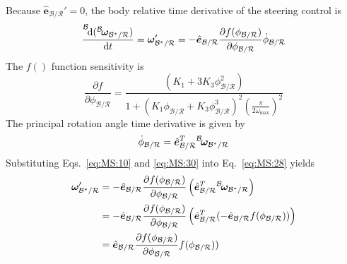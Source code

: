 \documentclass[]{BasiliskReportMemo}
\begin{document}
Because $\hat{\bm e}_{\mathcal{B}/\mathcal{R}}'= 0$, the body relative time derivative of the steering control is
\begin{equation}
	\label{eq:MS:28}
	\frac{\leftexp{B}{\D (\leftexp{B}{\bm\omega}_{{\mathcal{B}}^{\ast}/\mathcal{R}} ) }}{\D t} =
	{\bm\omega}_{{\mathcal{B}}^{\ast}/\mathcal{R}} '
	= - \hat{\bm e}_{\mathcal{B}/\mathcal{R}} \frac{\partial f(\phi_{\mathcal{B}/\mathcal{R}})}{\partial \phi_{\mathcal{B}/\mathcal{R}}} \dot\phi_{\mathcal{B}/\mathcal{R}}
\end{equation}
The $f()$ function sensitivity is
\begin{equation}
	\frac{
		\partial f
	}{
		\partial \phi_{\mathcal{B}/\mathcal{R}}
	} = 
	\frac{
	(K_{1}  + 3 K_{3} \phi_{\mathcal{B}/\mathcal{R}}^{2})
	}{
	1+(K_{1}\phi_{\mathcal{B}/\mathcal{R}} + K_{3} \phi_{\mathcal{B}/\mathcal{R}}^{3})^{2} \left(\frac{\pi}{2 \omega_{\text{max}}}\right)^{2}
	}
\end{equation}
The principal rotation angle time derivative is given by\cite{hughes}
\begin{equation}
	\label{eq:MS:30}
	\dot\phi_{\mathcal{B}/\mathcal{R}} = \hat{\bm e}_{\mathcal{B}/\mathcal{R}}^{T} 
	\leftexp{B}{\bm\omega}_{{\mathcal{B}}^{\ast}/\mathcal{R}} 
\end{equation}
Substituting Eqs.~\eqref{eq:MS:10} and \eqref{eq:MS:30} into Eq.~\eqref{eq:MS:28} yields
\begin{align}
	{\bm\omega}_{{\mathcal{B}}^{\ast}/\mathcal{R}} '
	&= - \hat{\bm e}_{\mathcal{B}/\mathcal{R}} \frac{\partial f(\phi_{\mathcal{B}/\mathcal{R}})}{\partial \phi_{\mathcal{B}/\mathcal{R}}} 
	\left( \hat{\bm e}_{\mathcal{B}/\mathcal{R}}^{T} 
	\leftexp{B}{\bm\omega}_{{\mathcal{B}}^{\ast}/\mathcal{R}}  \right)
	\nonumber \\
	&= -
	 \hat{\bm e}_{\mathcal{B}/\mathcal{R}} \frac{\partial f(\phi_{\mathcal{B}/\mathcal{R}})}{\partial \phi_{\mathcal{B}/\mathcal{R}}} 
	 \left( \hat{\bm e}_{\mathcal{B}/\mathcal{R}}^{T} 
	 (-\hat{\bm e}_{\mathcal{B}/\mathcal{R}} f(\phi_{\mathcal{B}/\mathcal{R}}))
	\right)
	\nonumber \\
	&= \hat{\bm e}_{\mathcal{B}/\mathcal{R}} \frac{\partial f(\phi_{\mathcal{B}/\mathcal{R}})}{\partial \phi_{\mathcal{B}/\mathcal{R}}} 
	  f(\phi_{\mathcal{B}/\mathcal{R}}))
\end{align}	
\end{document}
